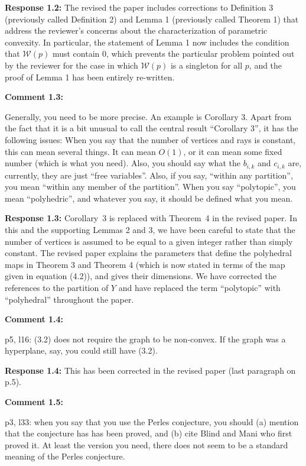 \documentclass[11pt, a4paper]{article}
\newcommand{\comment}[1]{{%
\begin{sffamily}\leavevmode\color{black}#1
\end{sffamily}}}%
\def\v{\vspace{2mm}}
\begin{document}
\v
\textbf{Response 1.2:}
The revised the paper includes corrections to Definition 3 (previously called Definition 2) and Lemma 1 (previously called Theorem 1) that address the reviewer's concerns about the characterization of parametric convexity. In particular, the statement of Lemma 1 now includes the condition that $\mathcal W(p)$ must contain $0$, which prevents the particular problem pointed out by the reviewer for the case in which $\mathcal W(p)$ is a singleton for all $p$, and the proof of Lemma 1 has been entirely re-written.

\v
\textbf{Comment 1.3:}
\comment{
Generally, you need to be more precise. An example is Corollary 3. Apart from the fact that it is a bit unusual to call the central result ``Corollary 3'', it has the following issues: When you say that the number of vertices and rays is constant, this can mean several things. It can mean $O(1)$, or it can mean some fixed number (which is what you need). Also, you should say what the $b_{i,k}$ and $c_{i,k}$ are, currently, they are just ``free variables''. Also, if you say, ``within any partition'', you mean ``within any member of the partition''. When you say ``polytopic'', you mean ``polyhedric'', and whatever you say, it should be defined what you mean.}

\v
\textbf{Response 1.3:}
Corollary~3 is replaced with Theorem~4 in the revised paper. In this and the supporting Lemmas 2 and 3, we have been careful to state that the number of vertices is assumed to be equal to a given integer rather than simply constant. The revised paper explains the parameters that define the polyhedral maps in Theorem 3 and Theorem 4 (which is now stated in terms of the map given in equation (4.2)), and gives their dimensions. We have corrected the references to the partition of $Y$ and have replaced the term ``polytopic'' with ``polyhedral'' throughout the paper. 

\v
\textbf{Comment 1.4:}
\comment{
p5, l16: (3.2) does not require the graph to be non-convex. If the graph was a hyperplane, say, you could still have (3.2).}

\v
\textbf{Response 1.4:}
This has been corrected in the revised paper (last paragraph on p.5).

\v
\textbf{Comment 1.5:}
\comment{
p3, l33: when you say that you use the Perles conjecture, you should (a) mention that the conjecture has has been proved, and (b) cite Blind and Mani who first proved it. At least the version you need, there does not seem to be a standard meaning of the Perles conjecture.}
\end{document}

